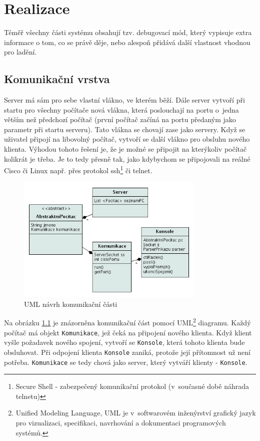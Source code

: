 \chapter{Realizace} \label{realizace}

Téměř všechny části systému obsahují tzv. debugovací mód, který vypisuje extra informace o tom, co se právě děje, nebo alespoň přidává další vlastnost vhodnou pro ladění.

\section{Komunikační vrstva}
Server má sám pro sebe vlastní vlákno, ve kterém běží. Dále server vytvoří při startu pro všechny počítače nová vlákna, která poslouchají na portu o~jedna větším než předchozí počítač (první počítač začíná na portu předaným jako parametr při startu serveru). Tato vlákna se chovají zase jako servery. Když se uživatel připojí na libovolný počítač, vytvoří se další vlákno pro obsluhu nového klienta. Výhodou tohoto řešení je, že je možné se připojit na kterýkoliv počítač kolikrát je třeba. Je to tedy přesně tak, jako kdybychom se připojovali na reálné Cisco či Linux např. přes protokol ssh\footnote{Secure Shell - zabezpečený komunikační protokol (v~současné době náhrada telnetu)} či telnet.

\begin{figure}[h]
\begin{center}
\includegraphics[width=9cm]{figures/uml_sit}
\caption{UML návrh komunikační části}
\label{uml:sit}
\end{center}
\end{figure}

Na obrázku \ref{uml:sit} je znázorněna komunikační část pomocí UML\footnote{Unified Modeling Language, UML je v~softwarovém inženýrství grafický jazyk pro vizualizaci, specifikaci, navrhování a dokumentaci programových systémů.\cite{wiki:uml}} diagramu. Každý počítač má objekt \verb|Komunikace|, jež čeká na připojení nového klienta. Když klient vyšle požadavek nového spojení, vytvoří se \verb|Konsole|, která tohoto klienta bude obsluhovat. Při odpojení klienta \verb|Konsole| zaniká, protože její přítomnost už není potřeba. \verb|Komunikace| se tedy chová jako server, který vytváří klienty - \verb|Konsole|.

